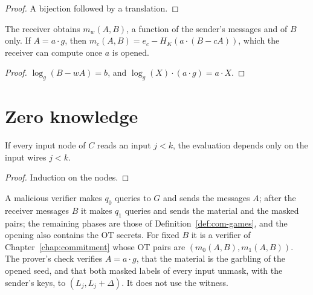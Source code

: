 \begin{proof}
  \leanok
  A bijection followed by a translation.
\end{proof}

\begin{lemma}
  \label{lem:recv-mof}
  \leanok
  The receiver obtains $m_w(A, B)$, a function of the sender's messages and of $B$ only. If
  $A = a \cdot g$, then $m_c(A, B) = e_c - H_K(a \cdot (B - cA))$, which the receiver can compute
  once $a$ is opened.
\end{lemma}

\begin{proof}
  \leanok
  $\log_g(B - wA) = b$, and $\log_g(X) \cdot (a \cdot g) = a \cdot X$.
\end{proof}

\section{Zero knowledge}

\begin{lemma}
  \label{lem:inputs-below}
  \leanok
  If every input node of $C$ reads an input $j < k$, the evaluation depends only on the input
  wires $j < k$.
\end{lemma}

\begin{proof}
  \leanok
  Induction on the nodes.
\end{proof}

\begin{definition}
  \label{def:ot-ver}
  \leanok
  A malicious verifier makes $q_0$ queries to $G$ and sends the messages $A$; after the receiver
  messages $B$ it makes $q_1$ queries and sends the material and the masked pairs; the remaining
  phases are those of Definition~\ref{def:com-games}, and the opening also contains the OT
  secrets. For fixed $B$ it is a verifier of Chapter~\ref{chap:commitment} whose OT pairs are
  $(m_0(A, B), m_1(A, B))$. The prover's check verifies $A = a \cdot g$, that the material is the
  garbling of the opened seed, and that both masked labels of every input unmask, with the sender's
  keys, to $(L_j, L_j + \Delta)$. It does not use the witness.
\end{definition}

